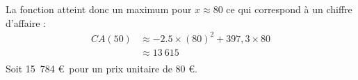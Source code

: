 {\begin{enumerate}
	\begin{center}
	\end{center}
	
	La fonction atteint donc un maximum pour $x \approx 80$ ce qui correspond à un chiffre d'affaire :
	\begin{align*}
	CA(50) & \approx -2.5 \times (80)^2 + 397,3 \times 80  \\
	& \approx 13~615 \\
	\end{align*}
	Soit 15~784 \euro~pour un prix unitaire de 80 \euro.
 \end{enumerate}
}

